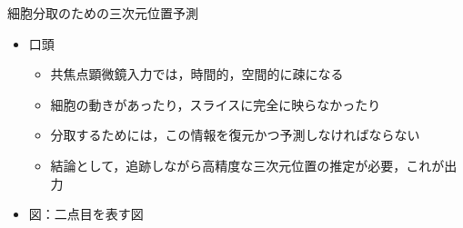 \begin{frame}[noframenumbering]{細胞分取のための三次元位置予測}
    \begin{itemize}
        \item 口頭
        \begin{itemize}
            \item 共焦点顕微鏡入力では，時間的，空間的に疎になる
            \item 細胞の動きがあったり，スライスに完全に映らなかったり
            \item 分取するためには，この情報を復元かつ予測しなければならない
            \item 結論として，追跡しながら高精度な三次元位置の推定が必要，これが出力
        \end{itemize}
        \item 図：二点目を表す図
    \end{itemize}
\end{frame}